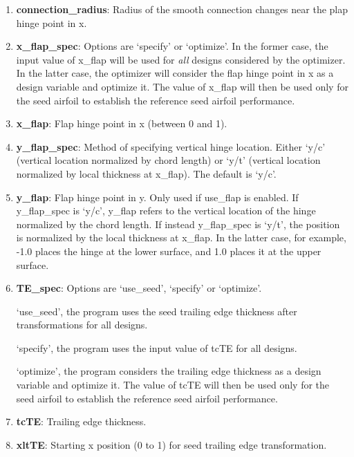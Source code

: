 \documentclass[11pt]{article}
\begin{document}
\begin{enumerate}
{	`both' activates all the flap\_connection changes.}
\item{\textbf{connection\_radius}: Radius of the smooth connection changes near the plap hinge point in x.}
\item{\textbf{x\_flap\_spec}: Options are `specify' or `optimize'.  In the former case, the input value of x\_flap
	will be used for \textit{all} designs considered by the optimizer.
	In the latter case, the optimizer will consider the flap hinge point in x as a design variable
	and optimize it.  The value of x\_flap will then be used
	only for the seed airfoil to establish the reference seed airfoil performance.}
\item{\textbf{x\_flap}: Flap hinge point in x (between 0 and 1).}
\item{\textbf{y\_flap\_spec}: Method of specifying vertical hinge location. Either `y/c'
	(vertical location normalized by chord length) or `y/t' (vertical location normalized by
	local thickness at x\_flap). The default is `y/c'.}
\item{\textbf{y\_flap}: Flap hinge point in y. Only used if use\_flap is enabled. If
	y\_flap\_spec is `y/c', y\_flap refers to the vertical location of the hinge normalized by
	the chord length. If instead y\_flap\_spec is `y/t', the position is normalized by the
	local thickness at x\_flap. In the latter case, for example, -1.0 places the hinge at the
	lower surface, and 1.0 places it at the upper surface.}
\item{\textbf{TE\_spec}: Options are `use\_seed', `specify' or `optimize'.
	
	`use\_seed', the program uses the seed trailing edge thickness after transformations for all designs.
	
	`specify', the program uses the input value of tcTE for all designs.
	
	 `optimize', the program considers the trailing edge thickness as a design variable
	 and optimize it. The value of tcTE will then be used
	 only for the seed airfoil to establish the reference seed airfoil performance.}
\item{\textbf{tcTE}: Trailing edge thickness.}
\item{\textbf{xltTE}: Starting x position (0 to 1) for seed trailing edge transformation.}


\end{enumerate}
\end{document}
